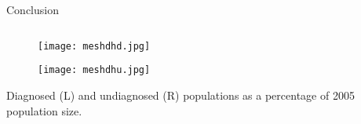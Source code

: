 \documentclass[final]{beamer}
\newlength{\onecolwid}
\newlength{\twocolwid}
\newlength{\threecolwid}
\begin{document}
\begin{frame}[t]
\begin{columns}[t]
\begin{column}{\threecolwid}
\begin{column}{\twocolwid}
\begin{column}{\twocolwid}
    \begin{tcolorbox}[enhanced,sharp corners=uphill,
 	colframe=Violet,coltext=White,interior style={left color=Blue,right color=DeepPink},
 	fontupper=\Large\bfseries,arc=6mm,boxrule=2mm,boxsep=5mm,
 	borderline={0.3mm}{0.3mm}{white}]
 	Conclusion
 \end{tcolorbox}
\begin{column}{\onecolwid}
  	\vspace{-3cm}
	\begin{multicols}{2}


	\begin{figure}
	\texttt{[image: meshdhd.jpg]}
\end{figure}
\begin{figure}
	\texttt{[image: meshdhu.jpg]}
\end{figure}
\end{multicols}
\vspace{-.5cm}
\centerline {\scriptsize Diagnosed (L) and undiagnosed (R) populations as a percentage of 2005 population size. }


\end{column}
\end{column}
\end{column}
\end{column}
\end{columns}
\end{frame}
\end{document}
